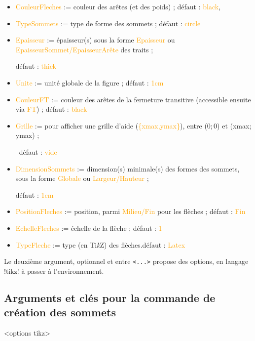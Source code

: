 \documentclass[french,a4paper,11pt]{article}
\providecommand\tikzlogo{Ti\textit{k}Z}
\let\TikZ\tikzlogo
\newcommand\Cle[1]{{\small\sffamily\textlangle \textcolor{orange}{#1}\textrangle}}
\begin{document}
{\begin{tipblock}
\begin{itemize}
	\hfill{}défaut : \Cle{black}
	\item \Cle{CouleurFleches} := couleur des arêtes (et des poids) ; \hfill{}défaut : \Cle{black},%
	\item \Cle{TypeSommets} := type de forme des sommets ; \hfill{}défaut : \Cle{circle}
	\item \Cle{Epaisseur} := épaisseur(s) sous la forme \Cle{Epaisseur} ou \Cle{EpaisseurSommet/EpaisseurArête} des traits ;
	
	\hfill{}défaut : \Cle{thick}
	\item \Cle{Unite} := unité globale de la figure ; \hfill{}défaut : \Cle{1cm}
	\item \Cle{CouleurFT} := couleur des arêtes de la fermeture transitive (accessible ensuite via \Cle{FT}) ; \hfill{}défaut : \Cle{black}
	\item \Cle{Grille} := pour afficher une grille d'aide (\Cle{\{xmax,ymax\}}), entre (0;\,0) et (xmax;\,ymax) ;
	
	\hfill~défaut : \Cle{vide}
	\item \Cle{DimensionSommets} := dimension(s) minimale(s) des formes des sommets, sous la forme \Cle{Globale} ou \Cle{Largeur/Hauteur} ;
	
	\hfill{}défaut : \Cle{1cm}
	\item \Cle{PositionFleches} := position, parmi \Cle{Milieu/Fin} pour les flèches ; \hfill{}défaut : \Cle{Fin}
	\item \Cle{EchelleFleches} := échelle de la flèche ; \hfill{}défaut : \Cle{1}
	\item \Cle{TypeFleche} := type (en \TikZ) des flèches.\hfill{}défaut : \Cle{Latex}
\end{itemize}

Le deuxième argument, optionnel et entre \texttt{<...>} propose des options, en langage \packagetex!tikz! à passer à l'environnement.
\end{tipblock}

\pagebreak

\subsection{Arguments et clés pour la commande de création des sommets}

\begin{DemoCode}
\begin{GrapheTikz}[clés]<options tikz>
\end{GrapheTikz}
\end{DemoCode}

}
\end{document}
